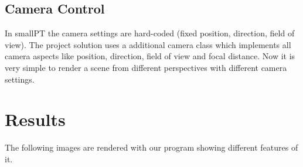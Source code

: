 \documentclass[11pt,a4paper]{article}
\begin{document}
\subsection{Camera Control}
In smallPT the camera settings are hard-coded (fixed position, direction, field of view). The project solution uses a additional camera class which implements all camera aspects like position, direction, field of view and focal distance. Now it is very simple to render a scene from different perspectives with different camera settings.

\section{Results}
The following images are rendered with our program showing different features of it.
\end{document}
